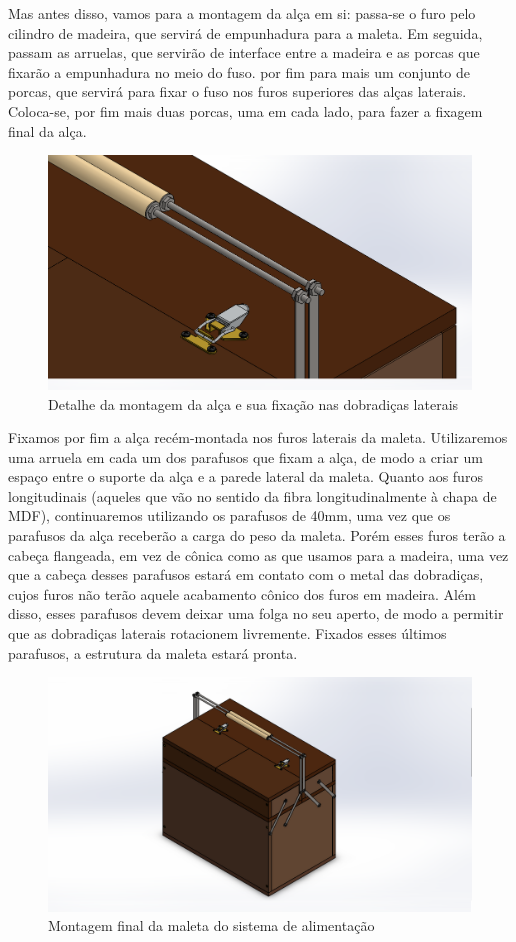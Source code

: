 \par Mas antes disso, vamos para a montagem da alça em si: passa-se o furo pelo cilindro de madeira, que servirá de empunhadura para a maleta. Em seguida, passam as arruelas, que servirão de interface entre a madeira e as porcas que fixarão a empunhadura no meio do fuso. por fim para mais um conjunto de porcas, que servirá para fixar o fuso nos furos superiores das alças laterais. Coloca-se, por fim mais duas porcas, uma em cada lado, para fazer a fixagem final da alça.

\begin{figure}[H]
    \centering
    \includegraphics[width=.7\textwidth]{Figuras/montagemMaletasEstrutura/alimentacaoAlcaDetalhe.png}
    \caption{Detalhe da montagem da alça e sua fixação nas dobradiças laterais}
    \label{fig:parafusoUniao}
\end{figure}

\par Fixamos por fim a alça recém-montada nos furos laterais da maleta. Utilizaremos uma arruela em cada um dos parafusos que fixam a alça, de modo a criar um espaço entre o suporte da alça e a parede lateral da maleta. Quanto aos furos longitudinais (aqueles que vão no sentido da fibra longitudinalmente à chapa de MDF), continuaremos utilizando os parafusos de 40mm, uma vez que os parafusos da alça receberão a carga do peso da maleta. Porém esses furos terão a cabeça flangeada, em vez de cônica como as que usamos para a madeira, uma vez que a cabeça desses parafusos estará em contato com o metal das dobradiças, cujos furos não terão aquele acabamento cônico dos furos em madeira. Além disso, esses parafusos devem deixar uma folga no seu aperto, de modo a permitir que as dobradiças laterais rotacionem livremente. Fixados esses últimos parafusos, a estrutura da maleta estará pronta.
 

\begin{figure}[H]
    \centering
    \includegraphics[width=.7\textwidth]{Figuras/montagemMaletasEstrutura/alimentacaoMontada.png}
    \caption{Montagem final da maleta do sistema de alimentação}
    \label{fig:ignicaoAlca}
\end{figure}

